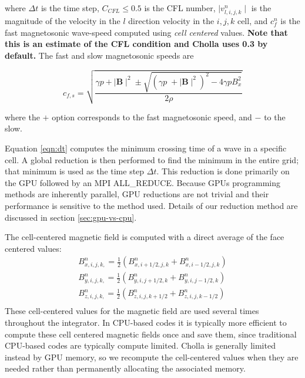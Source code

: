 \documentclass[modern, linenumbers]{aastex631}
\begin{document}
\noindent where $\Delta t$ is the time step, $C_{CFL} \leq 0.5$ is the CFL number, $\mid v^n_{l,i,j,k}\mid $ is the magnitude of the velocity in the $l$ direction velocity in the ${i,j,k}$ cell, and $c^n_f $ is the fast magnetosonic wave-speed computed using \emph{cell centered} values. \textbf{Note that this is an estimate of the CFL condition and Cholla uses 0.3 by default.} The fast and slow magnetosonic speeds are

\begin{equation}
    c_{f,s} = \sqrt{\frac
    {\gamma p + \mid \boldsymbol{B} \mid^2 \pm \sqrt{\left( \gamma p \;+ \mid \boldsymbol{B} \mid^2 \right)^2 - 4\gamma p B_x^2 } }
    {2\rho}}
\end{equation}

\noindent where the $+$ option corresponds to the fast magnetosonic speed, and $-$ to the slow.

Equation \ref{eqn:dt} computes the minimum crossing time of a wave in a specific cell. A global reduction is then performed to find the minimum in the entire grid; that minimum is used as the time step $\Delta t$. This reduction is done primarily on the GPU followed by an MPI ALL\_REDUCE. Because GPUs programming methods are inherently parallel, GPU reductions are not trivial and their performance is sensitive to the method used. Details of our reduction method are discussed in section \ref{sec:gpu-vs-cpu}.

The cell-centered magnetic field is computed with a direct average of the face centered values:
\begin{equation}
    \begin{aligned}
        B^n_{x,i,j,k,} = \frac{1}{2} \left( B^n_{x,i+1/2,j,k} + B^n_{x,i-1/2,j,k} \right) \\
        B^n_{y,i,j,k,} = \frac{1}{2} \left( B^n_{y,i,j+1/2,k} + B^n_{y,i,j-1/2,k} \right) \\
        B^n_{z,i,j,k,} = \frac{1}{2} \left( B^n_{z,i,j,k+1/2} + B^n_{z,i,j,k-1/2} \right) \\
    \end{aligned}
\end{equation}
These cell-centered values for the magnetic field are used several times throughout the integrator. In CPU-based codes it is typically more efficient to compute these cell centered magnetic fields once and save them, since traditional CPU-based codes are typically compute limited. Cholla is generally limited instead by GPU memory, so we recompute the cell-centered values when they are needed rather than permanently allocating the associated memory.
\end{document}
